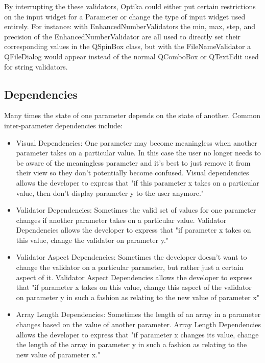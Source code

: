 	By interrupting the these validators, Optika could either put certain restrictions on the input widget for a Parameter or change the
	type of input widget used entirely. For instance: with EnhancedNumberValidators the min, max, step, and precision of the
	EnhancedNumberValidator are all used to directly set their corresponding values in the QSpinBox class, but with the FileNameValidator
	a QFileDialog would appear instead of the normal QComboBox or QTextEdit used for string validators.

	\subsection{Dependencies}
	Many times the state of one parameter depends on the state of another. Common inter-parameter dependencies include:
	\begin{itemize}
		\item Visual Dependencies: One parameter may become meaningless when another parameter takes on a particular value.
		In this case the user no longer needs to be aware of the meaningless parameter and it's best to just remove it from
		their view so they don't potentially become confused. Visual dependencies allows the developer to express that "if this parameter 
		x takes on a particular value, then don't display parameter y to the user anymore."
		\item Validator Dependencies: Sometimes the valid set of values for one parameter changes if another parameter takes
		on a particular value. Validator Dependencies allows the developer to express that "if parameter x takes on this value, change
		the validator on parameter y."
		\item Validator Aspect Dependencies: Sometimes the developer doesn't want to change the validator on a particular parameter, but
		rather just a certain aspect of it. Validator Aspect Dependencies allows the developer to express that "if parameter x takes on this value,
		change this aspect of the validator on parameter y in such a fashion as relating to the new value of parameter x"
		\item Array Length Dependencies: Sometimes the length of an array in a parameter changes based on the value of another parameter.
		Array Length Dependencies allows the developer to express that "if parameter x changes its value, change the length of the array
		in parameter y in such a fashion as relating to the new value of parameter x."
	\end{itemize}

